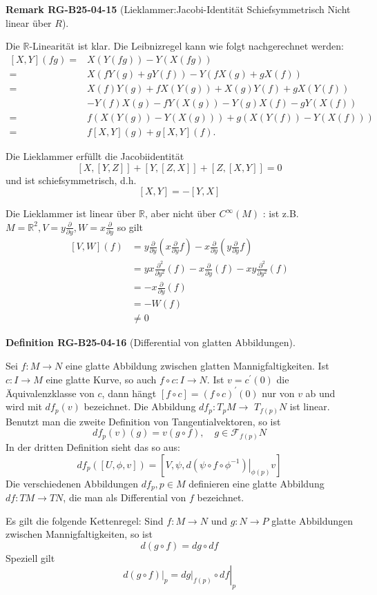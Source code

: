 \documentclass[10pt, letterpaper]{article}
\newcommand{\CustomHeading}[3]{%
  \par\medskip\noindent%
  \textbf{#1 #2} \textnormal{(#3)}.\enskip%
}
\newenvironment{DEF}[2]{\begin{unitbox}\CustomHeading{Definition}{#1}{#2}}{\end{unitbox}}
\newenvironment{REM}[2]{\begin{unitbox}\CustomHeading{Remark}{#1}{#2}}{\end{unitbox}}
\begin{document}
\begin{REM}{RG-B25-04-15}{Lieklammer:Jacobi-Identität Schiefsymmetrisch Nicht linear über $R$}
Die $\mathbb{R}$-Linearität ist klar. Die Leibnizregel kann wie folgt nachgerechnet werden:
$$
\begin{aligned}
{[X, Y](f g)=} & X(Y(f g))-Y(X(f g)) \\
= & X(f Y(g)+g Y(f))-Y(f X(g)+g X(f)) \\
= & X(f) Y(g)+f X(Y(g))+X(g) Y(f)+g X(Y(f)) \\
& -Y(f) X(g)-f Y(X(g))-Y(g) X(f)-g Y(X(f)) \\
= & f(X(Y(g))-Y(X(g)))+g(X(Y(f))-Y(X(f))) \\
= & f[X, Y](g)+g[X, Y](f) .
\end{aligned}
$$

Die Lieklammer erfüllt die Jacobiidentität
$$
[X,[Y, Z]]+[Y,[Z, X]]+[Z,[X, Y]]=0
$$
und ist schiefsymmetrisch, d.h.
$$
[X, Y]=-[Y, X]
$$

Die Lieklammer ist linear über $\mathbb{R}$, aber nicht über $C^{\infty}(M)$ : ist z.B. $M=\mathbb{R}^{2}, V=y \frac{\partial}{\partial y}, W=x \frac{\partial}{\partial y}$ so gilt
$$
\begin{aligned}
{[V, W](f) } & =y \frac{\partial}{\partial y}\left(x \frac{\partial}{\partial y} f\right)-x \frac{\partial}{\partial y}\left(y \frac{\partial}{\partial y} f\right) \\
& =y x \frac{\partial^{2}}{\partial y^{2}}(f)-x \frac{\partial}{\partial y}(f)-x y \frac{\partial^{2}}{\partial y^{2}}(f) \\
& =-x \frac{\partial}{\partial y}(f) \\
& =-W(f) \\
& \neq 0
\end{aligned}
$$
\end{REM}


\begin{DEF}{RG-B25-04-16}{Differential von glatten Abbildungen}
Sei $f: M \rightarrow N$ eine glatte Abbildung zwischen glatten Mannigfaltigkeiten. Ist $c: I \rightarrow M$ eine glatte Kurve, so auch $f \circ c: I \rightarrow N$. Ist $v=c^{\prime}(0)$ die Äquivalenzklasse von $c$, dann hängt $[f \circ c]=(f \circ c)^{\prime}(0)$ nur von $v$ ab und wird mit $d f_{p}(v)$ bezeichnet. Die Abbildung $d f_{p}: T_{p} M \rightarrow$ $T_{f(p)} N$ ist linear. Benutzt man die zweite Definition von Tangentialvektoren, so ist
$$
d f_{p}(v)(g)=v(g \circ f), \quad g \in \mathcal{F}_{f(p)} N
$$
In der dritten Definition sieht das so aus:
$$
d f_{p}([U, \phi, v])=\left[V, \psi,\left.d\left(\psi \circ f \circ \phi^{-1}\right)\right|_{\phi(p)} v\right]
$$
Die verschiedenen Abbildungen $d f_{p}, p \in M$ definieren eine glatte Abbildung $d f: T M \rightarrow T N$, die man als Differential von $f$ bezeichnet.

Es gilt die folgende Kettenregel: Sind $f: M \rightarrow N$ und $g: N \rightarrow P$ glatte Abbildungen zwischen Mannigfaltigkeiten, so ist
$$
d(g \circ f)=d g \circ d f
$$
Speziell gilt
$$
\left.d(g \circ f)\right|_{p}=\left.\left.d g\right|_{f(p)} \circ d f\right|_{p}
$$
\end{DEF}
\end{document}
